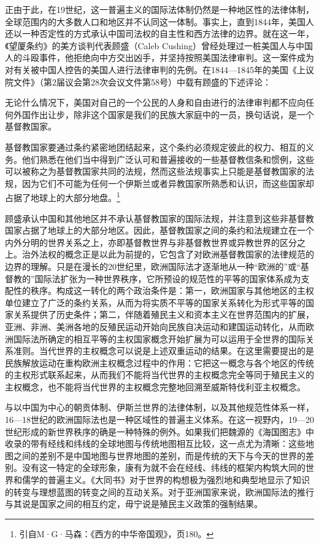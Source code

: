 \documentclass[a4paper, 12pt, openright]{ctexbook}
\renewenvironment{quote}
  {\list{}{\rightmargin2\ccwd \leftmargin2\ccwd \itemindent=2\ccwd \listparindent=2\ccwd}%
   \item\relax\small\kaishu\color{black}}
  {\endlist}
\begin{document}
正由于此，在19世纪，这一普遍主义的国际法体制仍然是一种地区性的法律体制，全球范围内的大多数人口和地区并不认同这一体制。事实上，直到1844年，美国人还以一种否定性的方式承认中国司法权的自主性和西方法律的边界。就在这一年，《望厦条约》的美方谈判代表顾盛（Caleb Cushing）曾经处理过一桩美国人与中国人的斗殴事件，他拒绝向中方交出凶手，并坚持按照美国法律审判。这一案件成为对有关被中国人控告的美国人进行法律审判的先例。在1844—1845年的美国《上议院文件》（第2届议会第28次会议文件第58号）中载有顾盛的下述评论：

\begin{quote}
无论什么情况下，美国对自己的一个公民的人身和自由进行的法律审判都不应向任何外国作出让步，除非这个国家是我们的民族大家庭中的一员，换句话说，是一个基督教国家。

基督教国家要通过条约紧密地团结起来，这个条约必须规定彼此的权力、相互的义务。他们熟悉在他们当中得到广泛认可和普遍接收的一些基督教信条和惯例，这些可以被称之为基督教国家共同的法规，然而这些法规事实上只能是基督教国家的法规，因为它们不可能为任何一个伊斯兰或者异教国家所熟悉和认识，而这些国家却占据了地球上的大部分地盘。\footnote{引自M·G·马森：《西方的中华帝国观》，页180。}
\end{quote}

顾盛承认中国和其他地区并不承认基督教国家的国际法规，并注意到这些非基督教国家占据了地球上的大部分地区。因此，基督教国家之间的条约和法规建立在一个内外分明的世界关系之上，亦即基督教世界与非基督教世界或异教世界的区分之上。治外法权的概念正是以此为前提的，它包含了对欧洲基督教国家的法律规范的边界的理解。只是在漫长的20世纪里，欧洲国际法才逐渐地从一种“欧洲的”或“基督教的”国际法扩张为一种世界秩序，它所预设的规范性的平等的国家体系成为支配性的秩序。构成这一转化的两个政治条件是：第一，欧洲国家与其他地区的主权单位建立了广泛的条约关系，从而为将实质不平等的国家关系转化为形式平等的国家关系提供了历史条件；第二，伴随着殖民主义和资本主义在世界范围内的扩展，亚洲、非洲、美洲各地的反殖民运动开始向民族自决运动和建国运动转化，从而欧洲国际法所确定的相互平等的主权国家概念开始扩展为可以运用于全世界的国际关系准则。当代世界的主权概念可以说是上述双重运动的结果。在这里需要提出的是民族解放运动在重构欧洲主权概念过程中的作用：它把这一概念与各个地区的传统的主权形式联系起来，从而我们不能将当代世界的主权概念完全等同于殖民主义的主权概念，也不能将当代世界的主权概念完整地回溯至威斯特伐利亚主权概念。

与以中国为中心的朝贡体制、伊斯兰世界的法律体制，以及其他规范性体系一样，16—18世纪的欧洲国际法也是一种区域性的普遍主义体系。在这一视野内，19—20世纪形成的新世界秩序的确是一种特殊的例外。如果我们把魏源的《海国图志》中收录的带有经线和纬线的全球地图与传统地图相互比较，这一点尤为清晰：这些地图之间的差别不是中国地图与世界地图的差别，而是传统的天下与今天的世界的差别。没有这一特定的全球形象，康有为就不会在经线、纬线的框架内构筑大同的世界和儒学的普遍主义。《大同书》对于世界的构想极为强烈地和典型地显示了知识的转变与理想蓝图的转变之间的互动关系。对于亚洲国家来说，欧洲国际法的推行与其说是国家之间的相互约定，毋宁说是殖民主义政策的强制结果。
\end{document}
